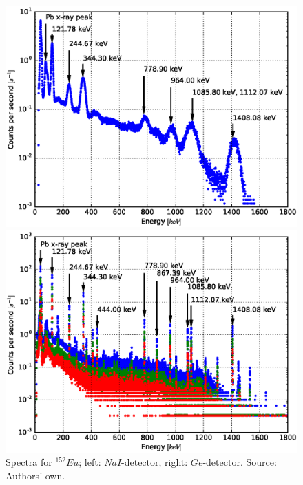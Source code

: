 \documentclass[a4paper]{article}
\begin{document}
\begin{figure}[H]
	\begin{minipage}[t]{0.5\textwidth}
		\begin{center}
		\includegraphics[width=1.0\textwidth]{plots/eu152.eps}
		\end{center}
	\end{minipage}
	\begin{minipage}[t]{0.5\textwidth}
		\begin{center}
		\includegraphics[width=1.0\textwidth]{plots/eu152_ged.eps}
		\end{center}
	\end{minipage}
	\caption{Spectra for $^{152}Eu$; left: $NaI$-detector, right: $Ge$-detector. Source: Authors' own.}
	\label{fig:eu152}
\end{figure}
\end{document}

